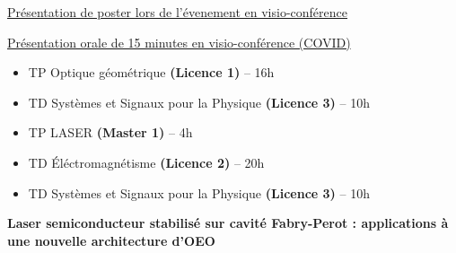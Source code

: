 \documentclass[9pt,a4paper,academicons]{altacv}
\begin{document}
\begin{fullwidth}
\medskip

\href{https://hal.science/hal-
	04133619}{Présentation de poster lors de l'évenement en visio-conférence}

\newpage


    
{}

\smallskip

\href{https://www.youtube.com/watch?v=NiCSm7F7ba8}{Présentation orale de 15 minutes en visio-conférence (COVID)}





 
\medskip


  \begin{itemize}
    \item TP Optique géométrique \textbf{(Licence 1)} -- 16h
    \item TD Systèmes et Signaux pour la Physique \textbf{(Licence 3)} -- 10h

  \end{itemize}

  \divider


  \begin{itemize}
    \item TP LASER \textbf{(Master 1)} -- 4h
    \item TD \'Eléctromagnétisme \textbf{(Licence 2)} -- 20h
    \item TD Systèmes et Signaux pour la Physique \textbf{(Licence 3)} -- 10h

  \end{itemize}

  \medskip
{}
    
\vspace{-1em}\textbf{Laser semiconducteur stabilisé sur cavité Fabry-Perot : applications à une
nouvelle architecture d'OEO}

\divider



\end{fullwidth}
\end{document}
